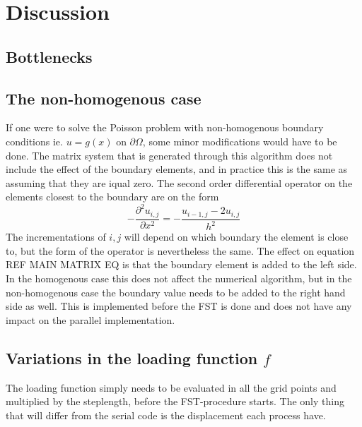 \section{Discussion}

\subsection{Bottlenecks}

\subsection{The non-homogenous case}
If one were to solve the Poisson problem with non-homogenous boundary conditions ie. $u = g(x) $ on $\partial \Omega$, 
some minor modifications would have to be done. 
The matrix system that is generated through this algorithm does not include the effect of the boundary elements, 
and in practice this is the same as assuming that they are iqual zero. The second order differential operator on the elements 
closest to the boundary are on the form 
\begin{equation}
	-\frac{\partial^2 u_{i,j}}{\partial x^2} = -\frac{u_{i-1,j}-2u_{i,j}}{h^2}
\end{equation}
The incrementations of $i,j$ will depend on which boundary the element is close to, but the form of the operator is nevertheless the same.
The effect on equation REF MAIN MATRIX EQ is that the boundary element is added to the left side.
In the homogenous case this does not affect the numerical algorithm, but in the non-homogenous case the boundary value needs to be added to the 
right hand side as well. This is implemented before the FST is done and does not have any impact on the parallel implementation. 

\subsection{Variations in the loading function $f$}
The loading function simply needs to be evaluated in all the grid points and multiplied by the steplength, before the 
FST-procedure starts. The only thing that will differ from the serial code is the displacement each process have.


